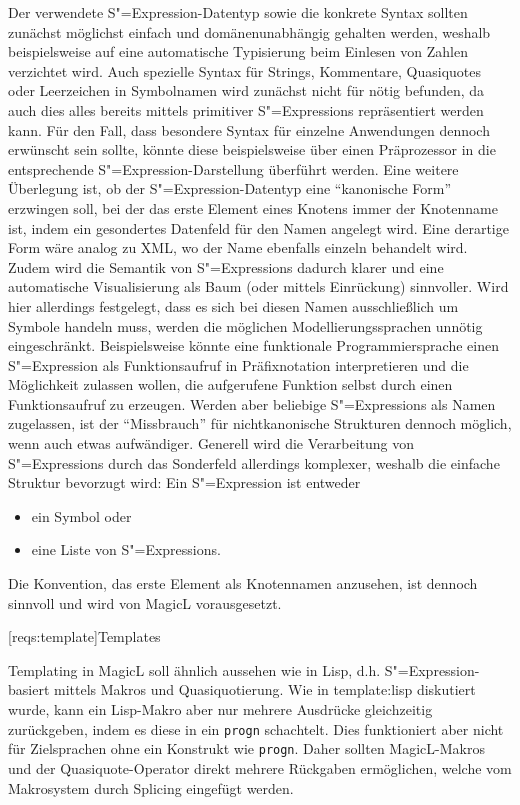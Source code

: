 \documentclass[12pt, a4paper, bibgerm]{scrbook}
\newcommand\icode[1]{\lstinline?#1?}
\newcommand\lsection{}
\newcommand\sref{}
\newcommand{\sexp}{S"=Expression}
\newcommand{\sexps}{S"=Expressions}
\begin{document}
Der verwendete \sexp{}-Datentyp sowie die konkrete Syntax sollten
zunächst möglichst einfach und domänenunabhängig gehalten werden,
weshalb beispielsweise auf eine automatische Typisierung beim Einlesen
von Zahlen verzichtet wird. Auch spezielle Syntax für Strings,
Kommentare, Quasiquotes oder Leerzeichen in Symbolnamen wird zunächst
nicht für nötig befunden, da auch dies alles bereits mittels primitiver
\sexps{} repräsentiert werden kann. Für den Fall, dass besondere Syntax
für einzelne Anwendungen dennoch erwünscht sein sollte, könnte diese
beispielsweise über einen Präprozessor in die entsprechende
\sexp{}-Darstellung überführt werden. Eine weitere Überlegung ist, ob der
\sexp{}-Datentyp eine "`kanonische Form"' erzwingen soll, bei der das
erste Element eines Knotens immer der Knotenname ist, indem ein
gesondertes Datenfeld für den Namen angelegt wird. Eine derartige Form
wäre analog zu XML, wo der Name ebenfalls einzeln behandelt wird. Zudem
wird die Semantik von \sexps{} dadurch klarer und eine automatische
Visualisierung als Baum (oder mittels Einrückung) sinnvoller.  Wird hier
allerdings festgelegt, dass es sich bei diesen Namen ausschließlich um
Symbole handeln muss, werden die möglichen Modellierungssprachen unnötig
eingeschränkt. Beispielsweise könnte eine funktionale Programmiersprache
einen \sexp{} als Funktionsaufruf in Präfixnotation interpretieren und
die Möglichkeit zulassen wollen, die aufgerufene Funktion selbst durch
einen Funktionsaufruf zu erzeugen. Werden aber beliebige \sexps{} als
Namen zugelassen, ist der "`Missbrauch"' für nichtkanonische Strukturen
dennoch möglich, wenn auch etwas aufwändiger. Generell wird die
Verarbeitung von \sexps{} durch das Sonderfeld allerdings komplexer,
weshalb die einfache Struktur bevorzugt wird: Ein \sexp{} ist entweder 
\begin{itemize}
\item ein Symbol oder 
\item eine Liste von \sexps{}.
\end{itemize}
Die Konvention, das erste Element als Knotennamen anzusehen, ist dennoch
sinnvoll und wird von MagicL vorausgesetzt.

\lsection[reqs:template]{Templates}

Templating in MagicL soll ähnlich aussehen wie in Lisp,
d.h. \sexp{}-basiert mittels Makros und Quasiquotierung. Wie in
\sref{template:lisp} diskutiert wurde, kann ein Lisp-Makro aber nur
mehrere Ausdrücke gleichzeitig zurückgeben, indem es diese in ein
\icode{progn} schachtelt. Dies funktioniert aber nicht für Zielsprachen
ohne ein Konstrukt wie \icode{progn}. Daher sollten MagicL-Makros und
der Quasiquote-Operator direkt mehrere Rückgaben ermöglichen,
welche vom Makrosystem durch Splicing eingefügt werden.
\end{document}
